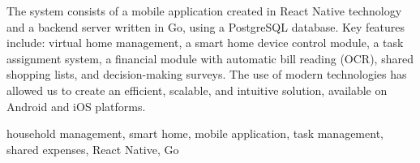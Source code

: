 The system consists of a mobile application created in React Native technology and a backend server written in Go, using a PostgreSQL database. Key features include: virtual home management, a smart home device control module, a task assignment system, a financial module with automatic bill reading (OCR), shared shopping lists, and decision-making surveys. The use of modern technologies has allowed us to create an efficient, scalable, and intuitive solution, available on Android and iOS platforms.

\vspace{10pt}
 household management, smart home, mobile application, task management, shared expenses, React Native, Go

